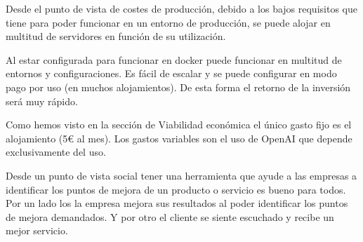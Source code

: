 Desde el punto de vista de costes de producción, debido a los bajos 
requisitos que tiene para poder funcionar en un entorno de producción, 
se puede alojar en multitud de servidores en función de su utilización.

Al estar configurada para funcionar en docker puede funcionar en multitud de entornos y configuraciones.
Es fácil de escalar y se puede configurar en modo pago por uso (en muchos alojamientos).
De esta forma el retorno de la inversión será muy rápido.

Como hemos visto en la sección de Viabilidad económica el único gasto fijo es el alojamiento (5€ al mes).
Los gastos variables son el uso de OpenAI que depende exclusivamente del uso.

Desde un punto de vista social tener una herramienta que ayude a las empresas a identificar los 
puntos de mejora de un producto o servicio es bueno para todos. 
Por un lado los la empresa mejora sus resultados al poder identificar los puntos de mejora demandados.
Y por otro el cliente se siente escuchado y recibe un mejor servicio.


